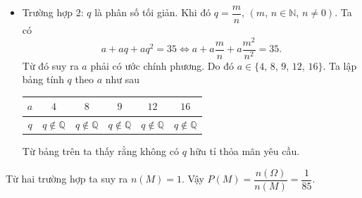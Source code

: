 \begin{bt}
{\begin{itemize}
\begin{itemize}
				\item Nếu $a=7$ ta được 
				$$1+q+q^2=5\Leftrightarrow \hoac{&q=\dfrac{-1+\sqrt{17}}{2}\\&q=\dfrac{-1-\sqrt{17}}{2}.}$$
				Vì cả hai nghiệm $q$ đều không nguyên nên ta loại trường hợp này
			\end{itemize} 
			\item Trường hợp $2$: $q$ là phân số tối giản. Khi đó $q=\dfrac{m}{n},\,(m,\,n\in \mathbb{N},\,n\neq 0)$. Ta có
			$$a+aq+aq^2=35\Leftrightarrow a+a\dfrac{m}{n}+a\dfrac{m^2}{n^2}=35.$$
			Từ đó suy ra $a$ phải có ước chính phương. Do đó $a\in\{4,\,8,\,9,\,12,\,16\}$. Ta lập bảng tính $q$ theo $a$ như sau
			\begin{center}
				\renewcommand{\arraystretch}{1.2}
				\begin{tabular}{|c|c|c|c|c|c|}
					\hline
					$a$&$4$&$8$&$9$&$12$&$16$\\
					\hline
					$q$&$q\notin \mathbb{Q}$&$q\notin \mathbb{Q}$&$q\notin \mathbb{Q}$&$q\notin \mathbb{Q}$&$q\notin \mathbb{Q}$\\
					\hline
				\end{tabular}
				\renewcommand{\arraystretch}{1}
			\end{center}
			\noindent
			Từ bảng trên ta thấy rằng không có $q$ hữu tỉ thỏa mãn yêu cầu.
		\end{itemize}
		Từ hai trường hợp ta suy ra $n(M)=1$. Vậy $P(M)=\dfrac{n(\Omega)}{n(M)}=\dfrac{1}{85}$.}
\end{bt}

